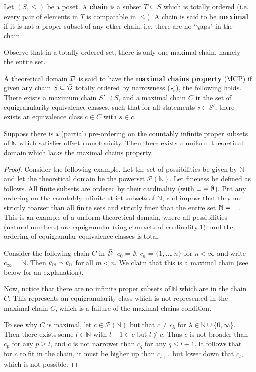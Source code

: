 \documentclass[10pt, onecolumn, longbibliography, nofootinbib]{revtex4-2}
\begin{document}
\begin{defn}
Let $(S,\leq)$ be a poset. A \textbf{chain} is a subset $T\subseteq S$ which is totally ordered (i.e. every pair of elements in $T$ is comparable in $\leq$). A chain is said to be \textbf{maximal} if it is not a proper subset of any other chain, i.e. there are no ``gaps" in the chain. 
\end{defn}
Observe that in a totally ordered set, there is only one maximal chain, namely the entire set. 

\begin{defn}
A theoretical domain $\bar{\mathcal{D}}$ is said to have the \textbf{maximal chains property} (MCP) if given any chain $S\subseteq\bar{\mathcal{D}}$ totally ordered by narrowness ($\preccurlyeq$), the following holds. There exists a maximum chain $S'\supseteq S$, and a maximal chain $C$ in the set of equigranularity equivalence classes, such that for all statements $s \in S'$, there exists an equivalence class $\overline{c}\in C$ with $s\in \overline{c}$.
\end{defn}

\begin{prop}
Suppose there is a (partial) pre-ordering on the countably infinite proper subsets of $\mathbb{N}$ which satisfies offset monotonicity. Then there exists a uniform theoretical domain which lacks the maximal chains property.
\end{prop}
\begin{proof}
Consider the following example. Let the set of possibilities be given by $\mathbb{N}$ and let the theoretical domain be the powerset $\mathcal{P}(\mathbb{N})$. Let fineness be defined as follows. All finite subsets are ordered by their cardinality (with $\bot = \emptyset$). Put any ordering on the countably infinite strict subsets of $\mathbb{N}$, and impose that they are strictly coarser than all finite sets and strictly finer than the entire set $\mathbb{N} = \top$. This is an example of a uniform theoretical domain, where all possibilities (natural numbers) are equigranular (singleton sets of cardinality 1), and the ordering of equigranular equivalence classes is total. 

Consider the following chain $C$ in $\bar{\mathcal{D}}$: $c_0 = \emptyset$, $c_n = \{1,\ldots, n\}$ for $n<\infty$ and write $c_{\infty} = \mathbb{N}$. Then $c_m \prec c_n$ for all $m<n$. We claim that this is a maximal chain (see below for an explanation).

Now, notice that there are no infinite proper subsets of $\mathbb{N}$ which are in the chain $C$. This represents an equigranularity class which is not represented in the maximal chain $C$, which is a failure of the maximal chains condition. 

To see why $C$ is maximal, let $c\in\mathcal{P}(\mathbb{N})$ but that $c\neq c_{\lambda}$ for $\lambda\in\mathbb{N}\cup\{0,\infty\}$. Then there exists some $l\in\mathbb{N}$ with $l+1\in c$ but $l\notin c$. Thus $c$ is not broader than $c_p$ for any $p\geq l$, and $c$ is not narrower than $c_q$ for any $q\leq l+1$. It follows that for $c$ to fit in the chain, it must be higher up than $c_{l+1}$ but lower down that $c_l$, which is not possible. 
\end{proof}
\end{document}
